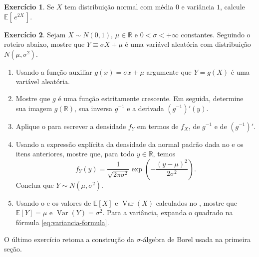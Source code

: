 \documentclass[12pt,portuguese]{article}
\theoremstyle{definition}
\theoremstyle{plainexercise}
\newtheorem{exercise}{Exercício}
\theoremstyle{starredexercise}
\theoremstyle{definition}
\begin{document}
\medskip

\begin{exercise}\label{exercise:esperanca-exponencial-quadrado}
  Se $X$ tem distribuição normal com média $0$ e variância $1$,
  calcule $\mathbb{E}\!\left[\,e^{2X}\,\right]$.
\end{exercise}

\begin{exercise}
  \label{exercise:transformacao-normal}
  Sejam $X\sim N(0,1)$, $\mu\in\mathbb{R}$ e $0<\sigma<+\infty$
  constantes. Seguindo o roteiro abaixo, mostre que 
  $Y\equiv\sigma X+\mu$ é uma variável aleatória
  com distribuição $N(\mu,\sigma^2)$.
  \begin{enumerate}[label=\textbf{(\alph*)}, leftmargin=*, itemsep=0.6em]
    \item Usando a função auxiliar $g(x)=\sigma x+\mu$ argumente que $Y=g(X)$ é uma
      variável aleatória.
    \item Mostre que $g$ é uma função estritamente crescente. Em seguida, determine
      sua imagem $g(\mathbb{R})$, sua inversa $g^{-1}$ e a derivada
      $(g^{-1})'(y)$.
    \item Aplique o  para escrever a
      densidade $f_Y$ em termos de $f_X$, de $g^{-1}$ e de $(g^{-1})'$.
    \item Usando a expressão explícita da densidade da normal padrão dada no
       e os itens anteriores, mostre que, para todo $y\in\mathbb{R}$, temos
      \[
        f_Y(y)
        =\frac{1}{\sqrt{2\pi\sigma^2}}
          \exp\!\left(-\frac{(y-\mu)^2}{2\sigma^2}\right).
      \]
      Conclua que $Y\sim N(\mu,\sigma^2)$.
    \item Usando o
       e os valores de $\mathbb{E}[X]$ e
      $\operatorname{Var}(X)$ calculados no ,
      mostre que $\mathbb{E}[Y]=\mu$ e $\operatorname{Var}(Y)=\sigma^2$.
      Para a variância, expanda o quadrado na fórmula
      \eqref{eq:variancia-formula}.
  \end{enumerate}
\end{exercise}

O último exercício retoma a construção da $\sigma$-álgebra de Borel
usada na primeira seção.
\end{document}
